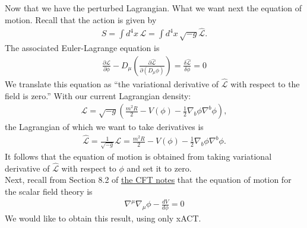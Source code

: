 \documentclass{book}
\theoremstyle{definition}
\newcommand{\p}{\partial}
\newcommand{\lag}{\mathcal{L}}
\newcommand{\f}[2]{\frac{#1}{#2}}
\newcommand{\lp}{\left(}
\newcommand{\rp}{\right)}
\begin{document}
Now that we have the perturbed Lagrangian. What we want next the equation of motion. Recall that the action is given by
\begin{align}
S = \int d^4x\,\lag = \int d^4x \,\sqrt{-g} \hat{\lag}.
\end{align}
The associated Euler-Lagrange equation is
\begin{align}
\boxed{\f{\p \hat{\lag}}{\p \phi} - D_\mu \lp \f{\p \hat{\lag}}{\p(D_\mu \phi)} \rp = \f{\delta \hat{\lag}}{\delta \phi} = 0}
\end{align}
We translate this equation as ``the variational derivative of $\hat{\lag}$ with respect to the field is zero.'' With our current Lagrangian density:
\begin{align}
\lag = \sqrt{-g} \lp \f{m^2 R}{2} - V(\phi) - \f{1}{2}\nabla_b \phi \nabla^b \phi \rp,
\end{align} 
the Lagrangian of which we want to take derivatives is 
\begin{align}
\hat{\lag} = \f{1}{\sqrt{-g}}\lag = \f{m^2 R}{2} - V(\phi) - \f{1}{2}\nabla_b \phi \nabla^b \phi .
\end{align}
It follows that the equation of motion is obtained from taking variational derivative of $\hat{\lag}$ with respect to $\phi$ and set it to zero.\\

Next, recall from Section 8.2 of \href{https://huanqbui.com/LaTeX projects/Classical_Fields_Theory/HuanBui_ClassicalFieldTheory.pdf}{\underline{the CFT notes}} that the equation of motion for the scalar field theory is 
\begin{align}
\boxed{\nabla^\mu \nabla_\mu \phi - \f{dV}{d\phi} = 0}
\end{align}
We would like to obtain this result, using only xACT. \\
\end{document}
